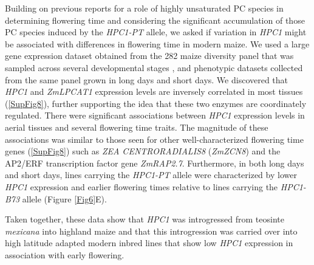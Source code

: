 \documentclass[9pt,twocolumn,twoside,lineno]{BioRxiv}
\begin{document}
Building on previous reports for a role of highly unsaturated PC species in determining flowering time \cite{Nakamura2014-qf, Riedelsheimer2013-bd} and considering the significant accumulation of those PC species induced by the \textit{HPC1-PT} allele, we asked if variation in \textit{HPC1} might be associated with differences in flowering time in modern maize. 
We used a large gene expression dataset obtained from the 282 maize diversity panel that was sampled across several developmental stages \cite{Kremling2018-gn}, and phenotypic datasets collected from the same panel grown in long days and short days.
We discovered that \textit{HPC1} and \textit{ZmLPCAT1} expression levels are inversely correlated in most tissues (\ref{SupFig8}), further supporting the idea that these two enzymes are coordinately regulated. 
There were significant associations between \textit{HPC1} expression levels in aerial tissues and several flowering time traits.
The magnitude of these associations was similar to those seen for other well-characterized flowering time genes (\ref{SupFig8}) such as \textit{ZEA CENTRORADIALIS8} (\textit{ZmZCN8})  and the AP2/ERF transcription factor gene \textit{ZmRAP2.7}.  
Furthermore, in both long days and short days, lines carrying the \textit{HPC1-PT} allele were characterized by lower \textit{HPC1} expression and earlier flowering times relative to lines carrying the \textit{HPC1-B73} allele (Figure \ref{Fig6}E). 

Taken together, these data show that \textit{HPC1} was introgressed from teosinte \textit{mexicana} into highland maize and that this introgression was carried over into high latitude adapted modern inbred lines that show low \textit{HPC1} expression in association with early flowering.
\end{document}

